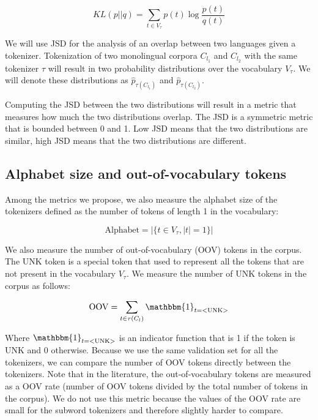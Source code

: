 \begin{equation}
    KL(p||q) = \sum_{t \in V_\tau} p(t) \log \frac{p(t)}{q(t)}
\end{equation}

We will use JSD for the analysis of an overlap between two languages given a tokenizer. Tokenization of two monolingual corpora $C_{l_1}$ and $C_{l_2}$ with the same tokenizer $\tau$ will result in two probability distributions over the vocabulary $V_\tau$. We will denote these distributions as $\hat{p}_{\tau(C_{l_1})}$ and $\hat{p}_{\tau(C_{l_2})}$. 

Computing the JSD between the two distributions will result in a metric that measures how much the two distributions overlap. The JSD is a symmetric metric that is bounded between 0 and 1. Low JSD means that the two distributions are similar, high JSD means that the two distributions are different. 

\subsection{Alphabet size and out-of-vocabulary tokens}

Among the metrics we propose, we also measure the alphabet size of the tokenizers defined as the number of tokens of length 1 in the vocabulary:

\begin{equation}
    \mathrm{Alphabet} = |\{t \in V_\tau, |t| = 1\}|
\end{equation}

We also measure the number of out-of-vocabulary (OOV) tokens in the corpus. The UNK token is a special token that used to represent all the tokens that are not present in the vocabulary $V_\tau$. We measure the number of UNK tokens in the corpus as follows:

\begin{equation}
    \mathrm{OOV} = \sum_{t \in \tau(C_l)} \mathbbm{1}_{t = \mathrm{<UNK>}}
\end{equation}

Where $\mathbbm{1}_{t = \mathrm{<UNK>}}$ is an indicator function that is 1 if the token is UNK and 0 otherwise. Because we use the same validation set for all the tokenizers, we can compare the number of OOV tokens directly between the tokenizers. Note that in the literature, the out-of-vocabulary tokens are measured as a OOV rate (number of OOV tokens divided by the total number of tokens in the corpus). We do not use this metric because the values of the OOV rate are small for the subword tokenizers and therefore slightly harder to compare.

